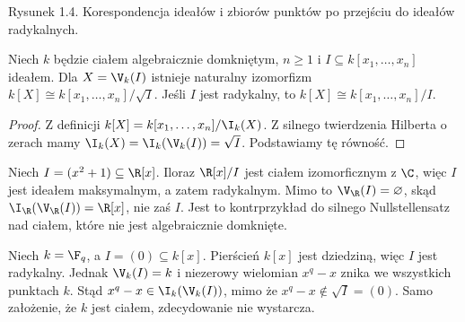 \begin{center}
\end{center}
\begin{center}\small Rysunek 1.4. Korespondencja ideałów i zbiorów punktów po przejściu do ideałów radykalnych.\end{center}

\begin{wniosek}
\label{wn:coordinate-ring}
Niech $k$ będzie ciałem algebraicznie domkniętym,
$n\ge1$ i $I\subseteq k[x_1,\dots,x_n]$ ideałem.
Dla $X=\V_k(I)$ istnieje naturalny izomorfizm
$k[X]\cong k[x_1,\dots,x_n]/\sqrt I$.
Jeśli $I$ jest radykalny, to $k[X]\cong k[x_1,\dots,x_n]/I$.
\end{wniosek}
\begin{proof}
Z definicji $k[X]=k[x_1,\dots,x_n]/\I_k(X)$.
Z silnego twierdzenia Hilberta o zerach mamy
$\I_k(X)=\I_k(\V_k(I))=\sqrt I$. Podstawiamy tę równość.
\end{proof}

\begin{przyklad}
Niech $I=(x^2+1)\subseteq\R[x]$.
Iloraz $\R[x]/I$ jest ciałem izomorficznym z $\C$, więc
$I$ jest ideałem maksymalnym, a zatem radykalnym.
Mimo to $\V_{\R}(I)=\varnothing$, skąd
$\I_{\R}(\V_{\R}(I))=\R[x]$, nie zaś $I$.
Jest to kontrprzykład do silnego Nullstellensatz nad
ciałem, które nie jest algebraicznie domknięte.
\end{przyklad}

\begin{przyklad}
Niech $k=\F_q$, a $I=(0)\subseteq k[x]$.
Pierścień $k[x]$ jest dziedziną, więc $I$ jest radykalny.
Jednak $\V_k(I)=k$ i niezerowy wielomian $x^q-x$
znika we wszystkich punktach $k$. Stąd
$x^q-x\in\I_k(\V_k(I))$, mimo że $x^q-x\notin\sqrt I=(0)$.
Samo założenie, że $k$ jest ciałem, zdecydowanie nie wystarcza.
\end{przyklad}

